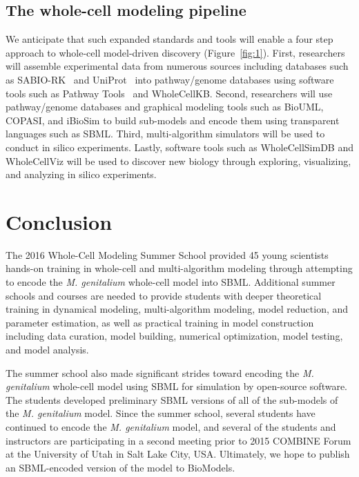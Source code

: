 \documentclass[journal,transmag]{IEEEtran}
\begin{document}
\subsection{The whole-cell modeling pipeline}
We anticipate that such expanded standards and tools will enable a four step approach to whole-cell model-driven discovery (Figure~\ref{fig:1}). First, researchers will assemble experimental data from numerous sources including databases such as SABIO-RK~\cite{Wittig2012} and UniProt~\cite{UniProt2015} into pathway/genome databases using software tools such as Pathway Tools~\cite{Karp2010} and WholeCellKB. Second, researchers will use pathway/genome databases and graphical modeling tools such as BioUML, COPASI, and iBioSim to build sub-models and encode them using transparent languages such as SBML. Third, multi-algorithm simulators will be used to conduct in silico experiments. Lastly, software tools such as WholeCellSimDB and WholeCellViz will be used to discover new biology through exploring, visualizing, and analyzing in silico experiments.

\section{Conclusion}
The 2016 Whole-Cell Modeling Summer School provided 45 young scientists hands-on training in whole-cell and multi-algorithm modeling through attempting to encode the \textit{M. genitalium} whole-cell model into SBML. Additional summer schools and courses are needed to provide students with deeper theoretical training in dynamical modeling, multi-algorithm modeling, model reduction, and parameter estimation, as well as practical training in model construction including data curation, model building, numerical optimization, model testing, and model analysis.

The summer school also made significant strides toward encoding the \textit{M. genitalium} whole-cell model using SBML for simulation by open-source software. The students developed preliminary SBML versions of all of the sub-models of the \textit{M. genitalium} model. Since the summer school, several students have continued to encode the \textit{M. genitalium} model, and several of the students and instructors are participating in a second meeting prior to 2015 COMBINE Forum at the University of Utah in Salt Lake City, USA. Ultimately, we hope to publish an SBML-encoded version of the model to BioModels. 
\end{document}
